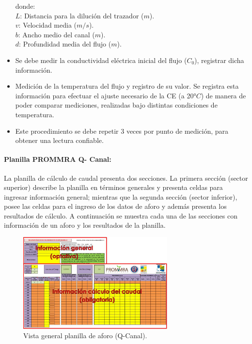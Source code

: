 \documentclass[]{article}
\begin{document}
\begin{itemize}
donde:\\
\(L\): Distancia para la dilución del trazador ($m$).\\
\(v\): Velocidad media ($m/s$).\\
\(b\): Ancho medio del canal ($m$).\\
\(d\): Profundidad media del flujo ($m$).\\
\item Se debe medir la conductividad eléctrica inicial del flujo ($C_0$), registrar dicha información.
\item Medición de la temperatura del flujo y registro de su valor. Se registra esta información para efectuar el ajuste necesario de la CE (a 20°$C$) de manera de poder comparar mediciones, realizadas bajo distintas condiciones de temperatura.
\item Este procedimiento se debe repetir 3 veces por punto de medición, para obtener una lectura confiable.
\end{itemize}

\paragraph{Planilla PROMMRA Q- Canal:}

La planilla de cálculo de caudal presenta dos secciones. La primera sección (sector superior) describe la planilla en términos generales y presenta celdas para ingresar información general; mientras que la segunda sección (sector inferior), posee las celdas para el ingreso de los datos de aforo y además presenta los resultados de cálculo. A continuación se muestra cada una de las secciones con información de un aforo y los resultados de la planilla.

\begin{figure}[h]
\centering
\includegraphics[width=0.7\textwidth]{images/planilla_qcanal.eps}
\caption{Vista general planilla de aforo (Q-Canal).}
\label{q_canal}
\end{figure}
\end{document}

